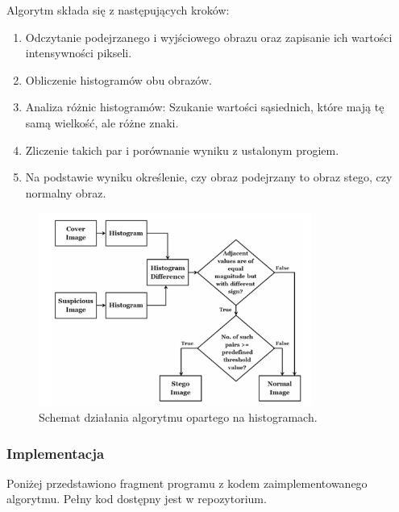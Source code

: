 Algorytm składa się z następujących kroków:
\begin{enumerate}
    \item Odczytanie podejrzanego i wyjściowego obrazu oraz zapisanie ich wartości intensywności pikseli.
    \item Obliczenie histogramów obu obrazów.
    \item Analiza różnic histogramów: Szukanie wartości sąsiednich, które mają tę samą wielkość, ale różne
    znaki.
    \item Zliczenie takich par i porównanie wyniku z ustalonym progiem.
    \item Na podstawie wyniku określenie, czy obraz podejrzany to obraz stego, czy normalny obraz.
\end{enumerate}

\begin{figure}[htbp]
    \centering
    \includegraphics[width=0.8\textwidth]{./img/hist_algorythm.png}
    \caption{Schemat działania algorytmu opartego na histogramach.}
    \label{fig:histogram_algorithm}
\end{figure}

\subsubsection{Implementacja}
Poniżej przedstawiono fragment programu z kodem zaimplementowanego algorytmu. Pełny kod dostępny jest w
repozytorium.

